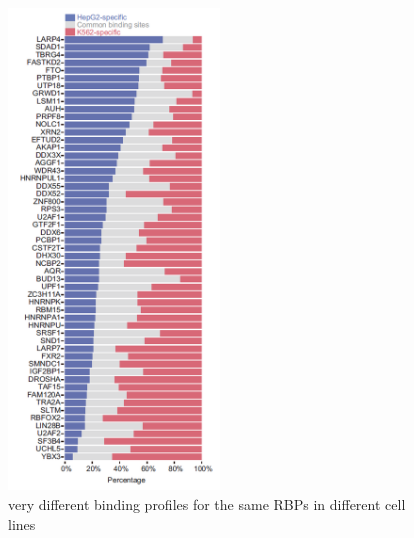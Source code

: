 \documentclass{ctexbeamer}
\begin{document}
\begin{frame}
\begin{columns}[T]
\begin{column}{0.5\textwidth}
\begin{figure}[H]
        \includegraphics[width=0.5\textwidth]{./figures/binding_site.png}
        \caption{very different binding profiles for the same RBPs in
different cell lines}
        \label{fig:bs}
      \end{figure}
    \end{column}
  \end{columns}
\end{frame}
\end{document}
